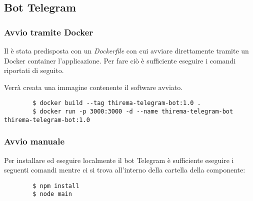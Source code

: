 	\subsection{Bot Telegram}

		\subsubsection{Avvio tramite Docker}
		Il  è stata predisposta con un \textit{Dockerfile} con cui avviare direttamente tramite un Docker container l'applicazione. Per fare ciò è sufficiente eseguire i comandi riportati di seguito.

        Verrà creata una immagine contenente il software avviato.

		\begin{verbatim}
		$ docker build --tag thirema-telegram-bot:1.0 .
		$ docker run -p 3000:3000 -d --name thirema-telegram-bot thirema-telegram-bot:1.0
		\end{verbatim}




		\subsubsection{Avvio manuale}
		Per installare ed eseguire localmente il bot Telegram è sufficiente eseguire i seguenti comandi mentre ci si trova all'interno della cartella della componente:
		\begin{verbatim}
		$ npm install
		$ node main
		\end{verbatim}
		
